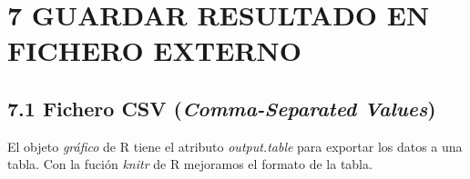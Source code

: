 \documentclass[
]{article}
\newenvironment{Shaded}{\begin{snugshade}}{\end{snugshade}}
\newcommand{\AttributeTok}[1]{\textcolor[rgb]{0.13,0.29,0.53}{#1}}
\newcommand{\CommentTok}[1]{\textcolor[rgb]{0.56,0.35,0.01}{\textit{#1}}}
\newcommand{\FunctionTok}[1]{\textcolor[rgb]{0.13,0.29,0.53}{\textbf{#1}}}
\newcommand{\NormalTok}[1]{#1}
\newcommand{\OtherTok}[1]{\textcolor[rgb]{0.56,0.35,0.01}{#1}}
\newcommand{\SpecialCharTok}[1]{\textcolor[rgb]{0.81,0.36,0.00}{\textbf{#1}}}
\newcommand{\StringTok}[1]{\textcolor[rgb]{0.31,0.60,0.02}{#1}}
\begin{document}
\newpage

\hypertarget{guardar-resultado-en-fichero-externo}{%
\section{7 GUARDAR RESULTADO EN FICHERO
EXTERNO}\label{guardar-resultado-en-fichero-externo}}

\hypertarget{fichero-csv-comma-separated-values}{%
\subsection{\texorpdfstring{7.1 Fichero CSV (\emph{Comma-Separated
Values})}{7.1 Fichero CSV (Comma-Separated Values)}}\label{fichero-csv-comma-separated-values}}

El objeto \emph{gráfico} de R tiene el atributo \emph{output.table} para
exportar los datos a una tabla. Con la fución \emph{knitr} de R
mejoramos el formato de la tabla.

\begin{Shaded}
\end{Shaded}
\end{document}
